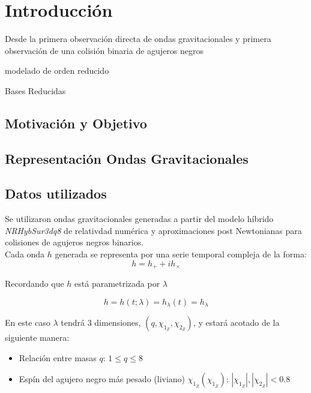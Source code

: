 \chapter{Introducción}

Desde la primera observación directa de ondas gravitacionales y primera observación de una colisión binaria de agujeros negros\cite{LIGOScientific:2016aoc}


 modelado de orden reducido \cite{Tiglio:2021ysj}
 
 Bases Reducidas \cite{rb0book, doi:10.1137/09075250X, PhysRevLett.106.221102, 10.1115/1.1448332, rb1book}




\section{Motivación y Objetivo}
\section{Representación Ondas Gravitacionales}
\section{Datos utilizados}

Se utilizaron ondas gravitacionales generadas a partir del modelo híbrido \textit{NRHybSur3dq8}\cite{Varma_2019} de relativdad numérica y aproximaciones post Newtonianas para colisiones de agujeros negros binarios.
\\

Cada onda \(h\) generada se representa por una serie temporal compleja de la forma:
\[
h = h_+ + ih_{\times}
\]


Recordando que $h$ está parametrizada por \(\lambda\)

 \[h = h(t; \lambda) = h_{\lambda}(t) = h_{\lambda} \]
 
En este caso \(\lambda\) tendrá 3 dimensiones, $(q, \chi_{1_Z},\chi_{2_Z}) $, y estará acotado de la siguiente manera:

\begin{itemize}
\item Relación entre masas $q$: $1 \le q \le 8$
\item Espín del agujero negro más pesado (liviano) $\chi_{1_Z} (\chi_{1_Z})$: $|\chi_{1_Z}|, |\chi_{2_Z}| < 0.8$
\end{itemize}

